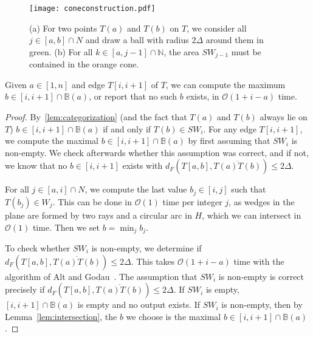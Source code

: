 \documentclass[a4paper,UKenglish,cleveref,thm-restate,notab]{lipics-v2021}
\newcommand{\dF}{\ensuremath{d_F}}
\newcommand{\bigO}{\mathcal{O}}
\newcommand{\N}{\mathbb{N}}
\newcommand{\B}{\mathbb{B}}
\newcommand{\SW}{\mathit{SW}}
\begin{document}
    \begin{figure}
        \centering
        \texttt{[image: coneconstruction.pdf]}
        \caption{(a) For two points $T(a)$ and $T(b)$ on $T$, we consider all $j \in [a, b] \cap N$ and draw a ball with radius $2\Delta$ around them in green. 
        (b) For all $k \in [a, j-1] \cap \N$, the area $\SW_{j-1}$ must be contained in the orange cone. }
        \label{fig:coneconstruction}
    \end{figure}
    
    \begin{lemma}
        \label{lem:maximum_of_edge}
        Given $a \in [1, n]$ and edge $T[i, i+1]$ of $T$, we can compute the maximum $b \in [i, i+1] \cap \B(a)$, or report that no such $b$ exists, in $\bigO(1+i-a)$ time.
    \end{lemma}
    \begin{proof}
        By~\cref{lem:categorization} (and the fact that $T(a)$ and $T(b)$ always lie on $T$) $b \in [i, i+1] \cap \B(a)$ if and only if $T(b) \in \SW_i$.
        For any edge $T[i, i+1]$, we compute the maximal $b \in [i, i+1] \cap \B(a)$ by first assuming that $\SW_i$ is non-empty.
        We check afterwards whether this assumption was correct, and if not, we know that no $b \in [i, i+1]$ exists with $\dF(T[a, b], \overline{T(a) T(b)}) \leq 2\Delta$.
        
        For all $j \in [a, i] \cap N$, we compute the last value $b_j \in [i, j]$ such that $T(b_j) \in W_j$. 
        This can be done in $\bigO(1)$ time per integer $j$, as wedges in the plane are formed by two rays and a circular arc in $H$, which we can intersect in $\bigO(1)$ time. 
        Then we set $b = \min_j b_j$.
        
        To check whether $\SW_i$ is non-empty, we determine if $\dF(T[a, b], \overline{T(a) T(b)}) \leq 2\Delta$.
        This takes $\bigO(1+i-a)$ time with the algorithm of Alt and Godau~\cite{alt95continuous_frechet}.
        The assumption that $\SW_i$ is non-empty is correct precisely if $\dF(T[a, b], \overline{T(a) T(b)}) \leq 2\Delta$.
        If $\SW_i$ is empty, $[i, i+1] \cap \B(a)$ is empty and no output exists. 
        If $\SW_i$ is non-empty, then by Lemma~\ref{lem:intersection}, the $b$ we choose is the maximal $b \in [i, i+1] \cap \B(a)$. 
    \end{proof}
    
\end{document}
